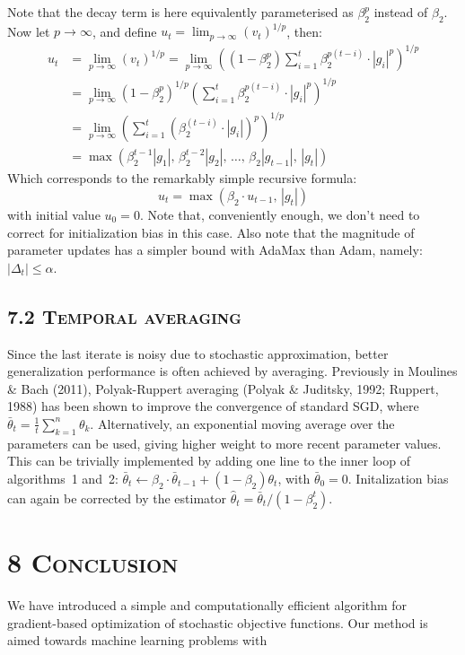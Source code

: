 \documentclass[11pt]{article}
\begin{document}
\vspace{1em}

\noindent
Note that the decay term is here equivalently parameterised as
$\beta_2^p$ instead of $\beta_2$. Now let $p \to \infty$, and
define $u_t = \lim_{p \to \infty}(v_t)^{1/p}$, then:
%
\begin{align}
u_t &= \lim_{p \to \infty}(v_t)^{1/p}
     = \lim_{p \to \infty}\!\left((1 - \beta_2^p) \sum_{i=1}^{t} \beta_2^{p(t-i)} \cdot |g_i|^p\right)^{\!1/p} \\
    &= \lim_{p \to \infty}(1 - \beta_2^p)^{1/p}
       \left(\sum_{i=1}^{t} \beta_2^{p(t-i)} \cdot |g_i|^p\right)^{\!1/p} \\
    &= \lim_{p \to \infty}\!\left(\sum_{i=1}^{t} \left(\beta_2^{(t-i)} \cdot |g_i|\right)^{p}\right)^{\!1/p} \\
    &= \max\!\left(\beta_2^{t-1}|g_1|,\, \beta_2^{t-2}|g_2|,\, \ldots,\, \beta_2 |g_{t-1}|,\, |g_t|\right)
\end{align}
%
Which corresponds to the remarkably simple recursive formula:
%
\begin{equation}
u_t = \max(\beta_2 \cdot u_{t-1},\, |g_t|)
\end{equation}
%
with initial value $u_0 = 0$. Note that, conveniently enough, we
don't need to correct for initialization bias in this case. Also
note that the magnitude of parameter updates has a simpler bound
with AdaMax than Adam, namely: $|\Delta_t| \leq \alpha$.

\vspace{0.5em}

\subsection*{7.2 \textsc{Temporal averaging}}

Since the last iterate is noisy due to stochastic approximation,
better generalization performance is often achieved by
averaging. Previously in Moulines \& Bach (2011), Polyak-Ruppert
averaging (Polyak \& Juditsky, 1992; Ruppert, 1988) has been
shown to improve the convergence of standard SGD, where
$\bar{\theta}_t = \frac{1}{t} \sum_{k=1}^{n} \theta_k$.
Alternatively, an exponential moving average over the parameters
can be used, giving higher weight to more recent parameter
values. This can be trivially implemented by adding one line to
the inner loop of algorithms~1 and~2:
$\bar{\theta}_t \leftarrow \beta_2 \cdot \bar{\theta}_{t-1} + (1 - \beta_2) \theta_t$,
with $\bar{\theta}_0 = 0$. Initalization bias can again be
corrected by the estimator
$\widehat{\theta}_t = \bar{\theta}_t / (1 - \beta_2^t)$.

\vspace{0.5em}

\section*{8 \textsc{Conclusion}}

We have introduced a simple and computationally efficient
algorithm for gradient-based optimization of stochastic objective
functions. Our method is aimed towards machine learning problems
with

\end{document}
